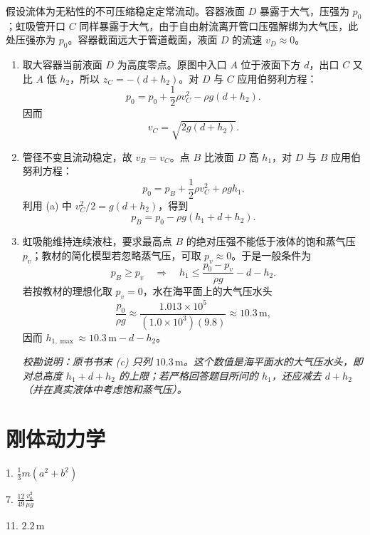 \begin{solution}
假设流体为无粘性的不可压缩稳定定常流动。容器液面 $D$ 暴露于大气，压强为 $p_0$；虹吸管开口 $C$ 同样暴露于大气，由于自由射流离开管口压强解绑为大气压，此处压强亦为 $p_0$。容器截面远大于管道截面，液面 $D$ 的流速 $v_D \approx 0$。

\begin{enumerate}
    \item[(a)] 取大容器当前液面 $D$ 为高度零点。原图中入口 $A$ 位于液面下方 $d$，出口 $C$ 又比 $A$ 低 $h_2$，所以 $z_C=-(d+h_2)$。对 $D$ 与 $C$ 应用伯努利方程：
    $$ p_0 = p_0 + \frac{1}{2}\rho v_C^2-\rho g(d+h_2). $$
    因而
    $$ \boxed{v_C=\sqrt{2g(d+h_2)}}. $$

    \item[(b)] 管径不变且流动稳定，故 $v_B=v_C$。点 $B$ 比液面 $D$ 高 $h_1$，对 $D$ 与 $B$ 应用伯努利方程：
    $$ p_0=p_B+\frac12\rho v_C^2+\rho gh_1. $$
    利用 (a) 中 $v_C^2/2=g(d+h_2)$，得到
    $$ \boxed{p_B=p_0-\rho g(h_1+d+h_2)}. $$

    \item[(c)] 虹吸能维持连续液柱，要求最高点 $B$ 的绝对压强不能低于液体的饱和蒸气压 $p_v$；教材的简化模型若忽略蒸气压，可取 $p_v\approx0$。于是一般条件为
    $$ p_B\ge p_v
       \quad\Longrightarrow\quad
       \boxed{h_1\le\frac{p_0-p_v}{\rho g}-d-h_2}. $$
    若按教材的理想化取 $p_v=0$，水在海平面上的大气压水头
    $$ \frac{p_0}{\rho g}\approx\frac{1.013\times10^5}{(1.0\times10^3)(9.8)}\approx10.3\,\mathrm m, $$
    因而 $h_{1,\max}\approx10.3\,\mathrm m-d-h_2$。

    \textit{校勘说明：原书书末 (c) 只列 $10.3\,\mathrm m$。这个数值是海平面水的大气压水头，即对总高度 $h_1+d+h_2$ 的上限；若严格回答题目所问的 $h_1$，还应减去 $d+h_2$（并在真实液体中考虑饱和蒸气压）。}
\end{enumerate}
\end{solution}



\chapter{刚体动力学}

\begin{oddanswers}
1. $\frac{1}{3}m(a^2 + b^2)$

7. $\frac{12}{49} \frac{v_0^2}{\mu g}$

11. $2.2\,\mathrm{m}$
\end{oddanswers}

